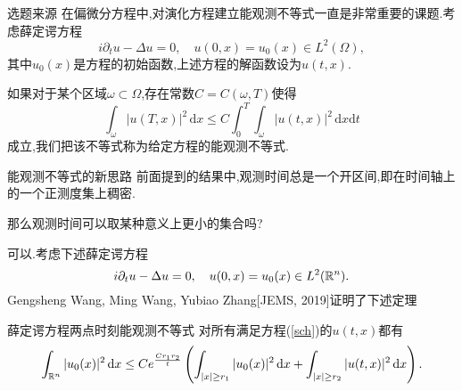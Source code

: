 

\begin{frame}[t]{选题来源}
  在偏微分方程中,对演化方程建立能观测不等式一直是非常重要的课题.考虑薛定谔方程
  \begin{equation}
    i\partial_t u-\Delta u=0,\quad u(0,x)=u_0(x)\in L^2(\Omega),
  \end{equation}
  其中$u_0(x)$是方程的初始函数,上述方程的解函数设为$u(t,x)$.
  
  如果对于某个区域$\omega \subset \Omega$,存在常数$C=C(\omega,T)$使得
  \begin{equation}
    \int_{\omega}|u(T,x)|^2\,\mathrm{d}x\le C \int_0^T\int_{\omega}|u(t,x)|^2\,\mathrm{d}x\mathrm{d}t\label{obs}
  \end{equation}
  成立,我们把该不等式称为给定方程的能观测不等式.
\end{frame}

\iffalse\begin{frame}[t]
  考虑薛定谔方程 
  \begin{equation}\label{sch}
    i\partial_t u -\Delta u=0,\quad u(0,x)=u_0(x)\in L^2(\R^{n}).
  \end{equation}
 能观测不等式是指下述形式的不等式
 \begin{equation}
   \int_{\Omega}|u(T,x)|^2\,\mathrm{d}x\le C(T,\Omega)\int_{0}^{T}\int_{\omega}|u(t,x)|^2\,\mathrm{d}x\mathrm{d}t,
 \end{equation}
 这里$\omega\subset \Omega$.
 \begin{itemize}
   \item Rosier-Zhang[JDE,2009]证明了全空间情形下有界区域外的可观测性, 即$\omega$ 可取为任意半径的球外.
   \item Jaffard[PM,1990], Komornik-Loreti[2005]证明周期边界条件下任意开集上的可观测性,即$\omega$ 可取为任意开集.
 \end{itemize}
\end{frame}
\fi



\begin{frame}[t]{能观测不等式的新思路}
  前面提到的结果中,观测时间总是一个开区间,即在时间轴上的一个正测度集上稠密.
  
  那么观测时间可以取某种意义上更小的集合吗?

  可以.考虑下述薛定谔方程
  \begin{equation}
    i\partial_t u-\Delta u=0,\quad u(0,x)=u_0(x)\in L^2(\mathbb{R}^n).\label{sch}
  \end{equation}
Gengsheng Wang, Ming Wang, Yubiao Zhang[JEMS, 2019]证明了下述定理
  \begin{alertblock}{薛定谔方程两点时刻能观测不等式} 
    对所有满足方程(\ref{sch})的$u(t,x)$都有
  \begin{equation}\label{obsch}
    \int_{\mathbb{R}^{n}}|u_0(x)|^2\,\mathrm{d}x\le Ce^{\frac{Cr_1 r_2}{t}}\left( \int_{|x|\ge r_1}|u_0(x)|^2\,\mathrm{d}x+\int_{|x|\ge r_2}|u(t,x)|^2 \,\mathrm{d}x \right).
  \end{equation}
  \end{alertblock}
\end{frame}

